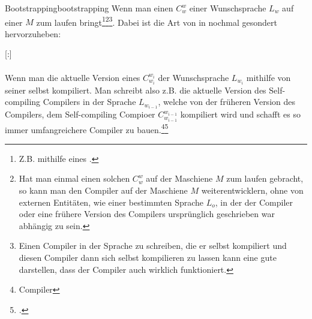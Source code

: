 \begin{Definition}{Bootstrapping}{bootstrapping}
  Wenn man einen  $C_{w}^{w}$ einer Wunschsprache $L_w$ auf einer  $M$ zum laufen bringt\footnote{Z.B. mithilfe eines .}\footnote{Hat man einmal einen solchen  $C_{w}^{w}$ auf der Maschiene $M$ zum laufen gebracht, so kann man den Compiler auf der Maschiene $M$ weiterentwicklern, ohne von externen Entitäten, wie einer bestimmten Sprache $L_o$, in der der Compiler oder eine frühere Version des Compilers ursprünglich geschrieben war abhängig zu sein.}\footnote{Einen Compiler in der Sprache zu schreiben, die er selbst kompiliert und diesen Compiler dann sich selbst kompilieren zu lassen kann eine gute  darstellen, dass der Compiler auch wirklich funktioniert.}. Dabei ist die Art von  in  nochmal gesondert hervorzuheben:

  \titleformat{\paragraph}[runin]{\normalfont\normalsize\bfseries}{}{0mm}{}[:]

  \paragraph{}\label{par:bootstrapping}\hspace{-0.25cm}
  Wenn man die aktuelle Version eines  $C_{w_i}^{w_i}$ der Wunschsprache $L_{w_i}$ mithilfe von  seiner selbst kompiliert. Man schreibt also z.B. die aktuelle Version des Self-compiling Compilers in der Sprache $L_{w_{i-1}}$, welche von der früheren Version des Compilers, dem Self-compiling Compioer $C_{w_{i-1}}^{w_{i-1}}$ kompiliert wird und schafft es so  immer umfangreichere Compiler zu bauen.\footnote{Compiler}\footcite{earley_formalism_1970}

\end{Definition}
